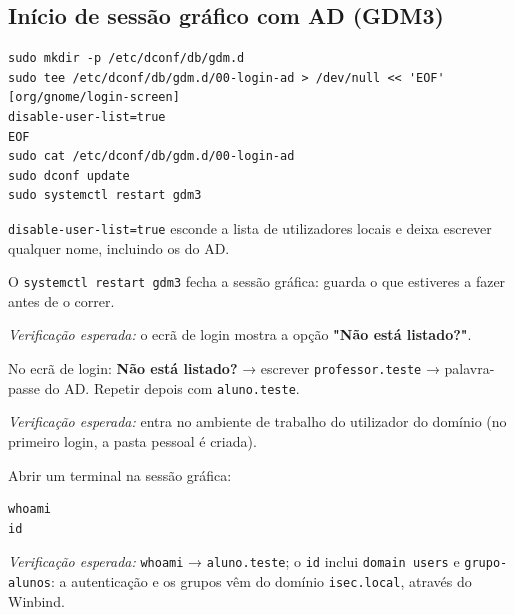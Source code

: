 
\subsection[Início de sessão gráfico com AD (GDM3)]{Início de sessão gráfico com AD (GDM3)}



\begin{lstlisting}[style=bashstyle]
sudo mkdir -p /etc/dconf/db/gdm.d
sudo tee /etc/dconf/db/gdm.d/00-login-ad > /dev/null << 'EOF'
[org/gnome/login-screen]
disable-user-list=true
EOF
sudo cat /etc/dconf/db/gdm.d/00-login-ad
sudo dconf update
sudo systemctl restart gdm3
\end{lstlisting}

\texttt{disable-user-list=true} esconde a lista de utilizadores locais e deixa escrever qualquer nome, incluindo os do AD.

\begin{simplesbox}
O \texttt{systemctl restart gdm3} fecha a sessão gráfica: guarda o que estiveres a fazer antes de o correr.
\end{simplesbox}

\emph{Verificação esperada:} o ecrã de login mostra a opção \textbf{"Não está listado?"}.


No ecrã de login: \textbf{Não está listado?} → escrever \texttt{professor.teste} → palavra-passe do AD. Repetir depois com \texttt{aluno.teste}.

\emph{Verificação esperada:} entra no ambiente de trabalho do utilizador do domínio (no primeiro login, a pasta pessoal é criada).


Abrir um terminal na sessão gráfica:

\begin{lstlisting}[style=bashstyle]
whoami
id
\end{lstlisting}

\emph{Verificação esperada:} \texttt{whoami} → \texttt{aluno.teste}; o \texttt{id} inclui \texttt{domain users} e \texttt{grupo-alunos}: a autenticação e os grupos vêm do domínio \texttt{isec.local}, através do Winbind.

